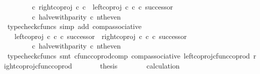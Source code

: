 \begin{isabellebody}
\ \ \ \ \ \ \ \ {\isasymcirc}\isactrlsub c\ {\isacharparenleft}{\kern0pt}right{\isacharunderscore}{\kern0pt}coproj\ {\isasymnat}\isactrlsub c\ {\isasymnat}\isactrlsub c\ {\isasymamalg}\ {\isacharparenleft}{\kern0pt}left{\isacharunderscore}{\kern0pt}coproj\ {\isasymnat}\isactrlsub c\ {\isasymnat}\isactrlsub c\ {\isasymcirc}\isactrlsub c\ successor{\isacharparenright}{\kern0pt}{\isacharparenright}{\kern0pt}{\isacharparenright}{\kern0pt}\isanewline
\ \ \ \ \ \ \ \ {\isasymcirc}\isactrlsub c\ halve{\isacharunderscore}{\kern0pt}with{\isacharunderscore}{\kern0pt}parity\ {\isasymcirc}\isactrlsub c\ nth{\isacharunderscore}{\kern0pt}even{\isachardoublequoteclose}\isanewline
\ \ \ \ \ \ \isamarkupfalse%
\ {\isacharparenleft}{\kern0pt}typecheck{\isacharunderscore}{\kern0pt}cfuncs{\isacharcomma}{\kern0pt}\ simp\ add{\isacharcolon}{\kern0pt}\ comp{\isacharunderscore}{\kern0pt}associative{}{\isacharparenright}{\kern0pt}\isanewline
\ \ \ \ \isamarkupfalse%
\ \isamarkupfalse%
\ {\isachardoublequoteopen}{\isachardot}{\kern0pt}{\isachardot}{\kern0pt}{\isachardot}{\kern0pt}\ {\isacharequal}{\kern0pt}\ {\isacharparenleft}{\kern0pt}{\isacharparenleft}{\kern0pt}left{\isacharunderscore}{\kern0pt}coproj\ {\isasymnat}\isactrlsub c\ {\isasymnat}\isactrlsub c\ {\isasymcirc}\isactrlsub c\ successor{\isacharparenright}{\kern0pt}\ {\isasymamalg}\ {\isacharparenleft}{\kern0pt}right{\isacharunderscore}{\kern0pt}coproj\ {\isasymnat}\isactrlsub c\ {\isasymnat}\isactrlsub c\ {\isasymcirc}\isactrlsub c\ successor{\isacharparenright}{\kern0pt}{\isacharparenright}{\kern0pt}\isanewline
\ \ \ \ \ \ \ \ {\isasymcirc}\isactrlsub c\ halve{\isacharunderscore}{\kern0pt}with{\isacharunderscore}{\kern0pt}parity\ {\isasymcirc}\isactrlsub c\ nth{\isacharunderscore}{\kern0pt}even{\isachardoublequoteclose}\isanewline
\ \ \ \ \ \ \isamarkupfalse%
\ {\isacharparenleft}{\kern0pt}typecheck{\isacharunderscore}{\kern0pt}cfuncs{\isacharcomma}{\kern0pt}\ smt\ cfunc{\isacharunderscore}{\kern0pt}coprod{\isacharunderscore}{\kern0pt}comp\ comp{\isacharunderscore}{\kern0pt}associative{}\ left{\isacharunderscore}{\kern0pt}coproj{\isacharunderscore}{\kern0pt}cfunc{\isacharunderscore}{\kern0pt}coprod\ right{\isacharunderscore}{\kern0pt}coproj{\isacharunderscore}{\kern0pt}cfunc{\isacharunderscore}{\kern0pt}coprod{\isacharparenright}{\kern0pt}\isanewline
\ \ \ \ \isamarkupfalse%
\ \isamarkupfalse%
\ {\isacharquery}{\kern0pt}thesis\isanewline
\ \ \ \ \ \ \isamarkupfalse%
\ calculation\ \isamarkupfalse%

\end{isabellebody}
